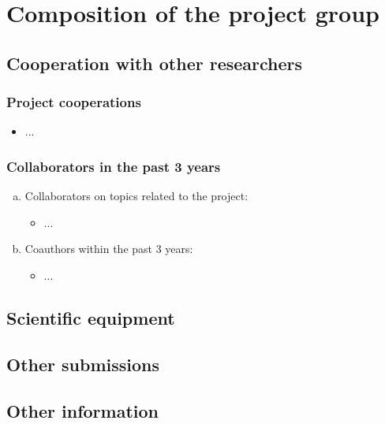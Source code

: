 \documentclass[a4paper,11pt]{article} %
\begin{document}
\section{Composition of the project group}
\subsection{Cooperation with other researchers}

\subsubsection{Project cooperations}

\begin{itemize}
  \item ...
\end{itemize}

\subsubsection{Collaborators in the past 3 years}

\begin{enumerate}[(a)]
  \item Collaborators on topics related to the project:
  \begin{itemize}
    \item ...
  \end{itemize}
  \item Coauthors within the past 3 years:
  \begin{itemize}
    \item ...
  \end{itemize}
\end{enumerate}

\subsection{Scientific equipment}

\subsection{Other submissions}

\subsection{Other information}
\end{document}
